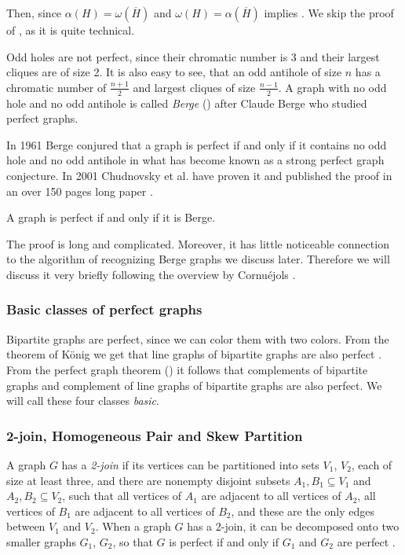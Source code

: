 
Then, since $\alpha(H) = \omega(\overline{H})$ and $\omega(H) = \alpha(\overline{H})$  implies . We skip the proof of , as it is quite technical.

Odd holes are not perfect, since their chromatic number is 3 and their largest cliques are of size 2. It is also easy to see, that an odd antihole of size $n$ has a chromatic number of $\frac{n+1}{2}$ and largest cliques of size $\frac{n-1}{2}$. A graph with no odd hole and no odd antihole is called \emph{Berge} () after Claude Berge who studied perfect graphs.

In 1961 Berge conjured that a graph is perfect if and only if it contains no odd hole and no odd antihole in what has become known as a strong perfect graph conjecture. In 2001 Chudnovsky et al. have proven it and published the proof in an over 150 pages long paper  \cite{MC06}.

\begin{theorem}
	\label{thm:spgt}
	A graph is perfect if and only if it is Berge.
\end{theorem}

The proof is long and complicated. Moreover, it has little noticeable connection to the algorithm of recognizing Berge graphs we discuss later. Therefore we will discuss it very briefly following the overview by Cornuéjols \cite{GC03}.

\subsubsection{Basic classes of perfect graphs}
Bipartite graphs are perfect, since we can color them with two colors. From the theorem of König we get that line graphs of bipartite graphs are also perfect \cite{Knig1916, GC03}. From the perfect graph theorem () it follows that complements of bipartite graphs and complement of line graphs of bipartite graphs are also perfect. We will call these four classes \emph{basic}.

\subsubsection{2-join, Homogeneous Pair and Skew Partition}
A graph $G$ has a \emph{2-join} if its vertices can be partitioned into sets $V_1$, $V_2$, each of size at least three, and there are nonempty disjoint subsets $A_1, B_1 \subseteq V_1$ and $A_2, B_2 \subseteq V_2$, such that all vertices of $A_1$ are adjacent to all vertices of $A_2$, all vertices of $B_1$ are adjacent to all vertices of $B_2$, and these are the only edges between $V_1$ and $V_2$. When a graph $G$ has a 2-join, it can be decomposed onto two smaller graphs $G_1$, $G_2$, so that $G$ is perfect if and only if $G_1$ and $G_2$ are perfect \cite{Cornujols1985}.

